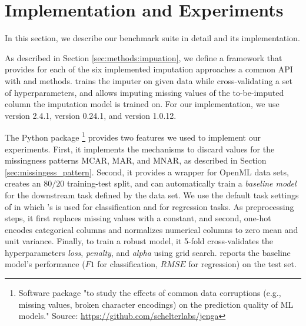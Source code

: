 \section{Implementation and Experiments}
\label{sec:implementation}
%
In this section, we describe our benchmark suite in detail and its implementation.

As described in Section \ref{sec:methods:impuation}, we define a framework that provides for each of the six implemented imputation approaches a common API with  and  methods.  trains the imputer on given data while cross-validating a set of hyperparameters, and  allows imputing missing values of the to-be-imputed column the imputation model is trained on. For our implementation, we use  version 2.4.1,  version 0.24.1, and  version 1.0.12.

The Python package \footnote{Software package "to study the effects of common data corruptions (e.g., missing values, broken character encodings) on the prediction quality of ML models." Source: \url{https://github.com/schelterlabs/jenga}} \citep{Jenga} provides two features we used to implement our experiments. First, it implements the mechanisms to discard values for the missingness patterns MCAR, MAR, and MNAR, as described in Section \ref{sec:missingess_pattern}. Second, it provides a wrapper for OpenML data sets, creates an $80/20$ training-test split, and can automatically train a \emph{baseline model} for the downstream task defined by the data set. We use the default task settings of  in which 's   is used for classification and  for regression tasks. As preprocessing steps, it first replaces missing values with a constant, and second, one-hot encodes categorical columns and normalizes numerical columns to zero mean and unit variance. Finally, to train a robust model, it 5-fold cross-validates the hyperparameters \emph{loss}, \emph{penalty}, and \emph{alpha} using grid search.  reports the baseline model's performance ($F1$ for classification, $RMSE$ for regression) on the test set.


